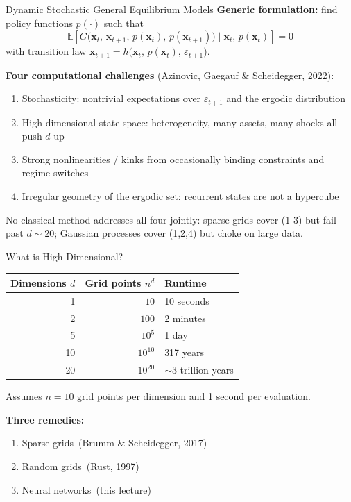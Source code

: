 \documentclass[aspectratio=169,11pt]{beamer}
\newcommand{\emphc}[1]{\textcolor{harvardcrimson}{#1}}
\newcommand{\x}{\bm{x}}
\newcommand{\E}[1]{\mathbb{E}\!\left[#1\right]}
\begin{document}
\begin{frame}{Dynamic Stochastic General Equilibrium Models}
\textbf{Generic formulation:} find policy functions $p(\cdot)$ such that
\[
\E{G\bigl(\x_t,\,\x_{t+1},\,p(\x_t),\,p(\x_{t+1})\bigr) \;\Big|\; \x_t,\,p(\x_t)} = 0
\]
with transition law $\x_{t+1} = h\bigl(\x_t,\,p(\x_t),\,\varepsilon_{t+1}\bigr)$.

\vspace{0.4em}
\textbf{Four computational challenges} (Azinovic, Gaegauf \& Scheidegger, 2022):
\begin{enumerate}
    \setlength{\itemsep}{1pt}
    \item \emphc{Stochasticity}: nontrivial expectations over $\varepsilon_{t+1}$ and the ergodic distribution
    \item \emphc{High-dimensional} state space: heterogeneity, many assets, many shocks all push $d$ up
    \item \emphc{Strong nonlinearities / kinks} from occasionally binding constraints and regime switches
    \item \emphc{Irregular geometry} of the ergodic set: recurrent states are not a hypercube
\end{enumerate}

\vspace{0.2em}
{\footnotesize No classical method addresses all four jointly: sparse grids cover (1-3) but fail past $d \sim 20$; Gaussian processes cover (1,2,4) but choke on large data.}
\end{frame}

\begin{frame}{What is High-Dimensional?}
\begin{center}
\begin{tabular}{rrl}
\toprule
\textbf{Dimensions $d$} & \textbf{Grid points $n^d$} & \textbf{Runtime} \\
\midrule
1 & $10$ & 10 seconds \\
2 & $100$ & 2 minutes \\
5 & $10^5$ & 1 day \\
10 & $10^{10}$ & 317 years \\
20 & $10^{20}$ & $\sim 3$ trillion years \\
\bottomrule
\end{tabular}
\end{center}

\vspace{0.5em}
{\small Assumes $n = 10$ grid points per dimension and 1 second per evaluation.}

\vspace{0.5em}
\textbf{Three remedies:}
\begin{enumerate}
    \item \emphc{Sparse grids}~(Brumm \& Scheidegger, 2017)
    \item \emphc{Random grids}~(Rust, 1997)
    \item \emphc{Neural networks}~(this lecture)
\end{enumerate}
\end{frame}
\end{document}
